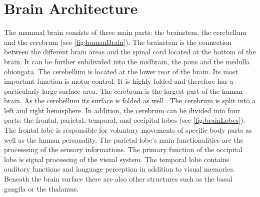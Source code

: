 \section{Brain Architecture}
%
The mammal brain consists of three main parts: the brainstem, the cerebellum and the cerebrum (see \cref{fig:humanBrain}).
% 
The brainstem is the connection between the different brain areas and the spinal cord located at the bottom of the brain.
It can be further subdivided into the midbrain, the pons and the medulla obiongata.
The cerebellum is located at the lower rear of the brain. Its most important function is motor control.
It is highly folded  and therefore has a particularly large surface area.
The cerebrum is the largest part of the human brain.
As the cerebellum its surface is folded as well .
The cerebrum is split into a left and right hemisphere.
In addition, the cerebrum can be divided into four parts:
the frontal, parietal, temporal, and occipital lobes (see \cref{fig:brainLobes}).
The frontal lobe is responsible for voluntary movements of specific body parts as well as the human personality.
The parietal lobe's main functionalities are the processsing of the sensory informations.
The primary function of the occipital lobe is signal processing of the visual system.
The temporal lobe contains auditory functions and language perception in addition to visual memories.
Beneath the brain surface there are also other structures such as the basal gangila or the thalamus.
\par
% 
